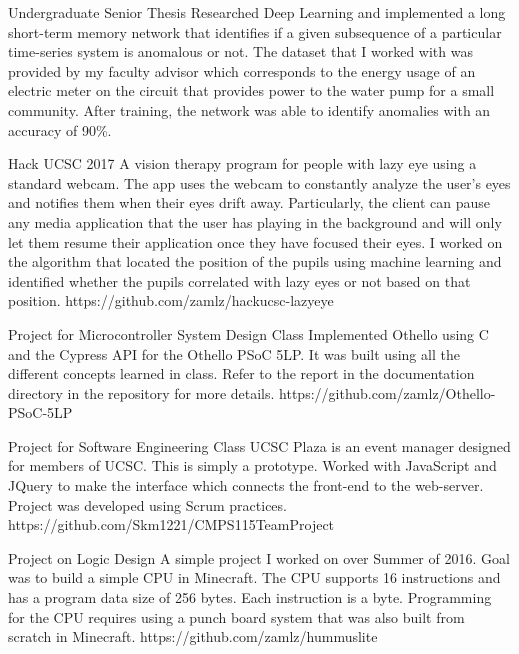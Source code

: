\documentclass{cv}
\begin{document}
\begin{adjustwidth}{0.5cm}{0.5cm}
{Undergraduate Senior Thesis}
{Researched Deep Learning and implemented a long short-term memory
network that identifies if a given subsequence of a particular
time-series system is anomalous or not. The dataset that I worked with
was provided by my faculty advisor which corresponds to the energy usage
of an electric meter on the circuit that provides power to the water
pump for a small community. After training, the network was able to identify
anomalies with an accuracy of 90\%.}{}

{Hack UCSC 2017}
{A vision therapy program for people with lazy eye using a standard
webcam. The app uses the webcam to constantly analyze the user's eyes
and notifies them when their eyes drift away. Particularly, the client
can pause any media application that the user has playing in the
background and will only let them resume their application once they
have focused their eyes. I worked on the algorithm that located the
position of the pupils using machine learning and identified whether
the pupils correlated with lazy eyes or not based on that position.}
{https://github.com/zamlz/hackucsc-lazyeye}

{Project for Microcontroller System Design Class}
{Implemented Othello using C and the Cypress API for the Othello PSoC 5LP.
It was built using all the different concepts learned in class. Refer to the
report in the documentation directory in the repository for more details.}
{https://github.com/zamlz/Othello-PSoC-5LP}

{Project for Software Engineering Class}
{UCSC Plaza is an event manager designed for members of UCSC. This is simply
a prototype. Worked with JavaScript and JQuery to make the interface which
connects the front-end to the web-server. Project was developed using Scrum
practices.}
{https://github.com/Skm1221/CMPS115TeamProject}

{Project on Logic Design}
{A simple project I worked on over Summer of 2016. Goal was to build a simple
CPU in Minecraft. The CPU supports 16 instructions and has a program data
size of 256 bytes. Each instruction is a byte. Programming for the CPU
requires using a punch board system that was also built from scratch in
Minecraft.}
{https://github.com/zamlz/hummuslite}
\end{adjustwidth}
\end{document}
